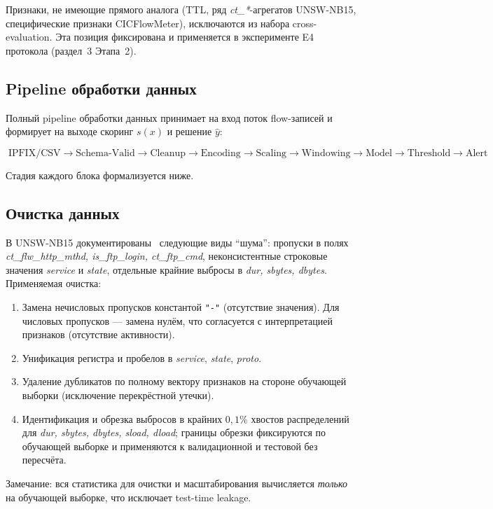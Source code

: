 Признаки, не имеющие прямого аналога (TTL, ряд \emph{ct\_*}-агрегатов
UNSW-NB15, специфические признаки CICFlowMeter), исключаются из набора
cross-evaluation. Эта позиция фиксирована и применяется в эксперименте E4
протокола (раздел~3 Этапа~2).

\subsection{Pipeline обработки данных}

Полный pipeline обработки данных принимает на вход поток flow-записей и
формирует на выходе скоринг \(s(x)\) и решение \(\hat{y}\):

\[
\boxed{\;
\text{IPFIX/CSV} \to
\text{Schema-Valid} \to
\text{Cleanup} \to
\text{Encoding} \to
\text{Scaling} \to
\text{Windowing} \to
\text{Model} \to
\text{Threshold} \to
\text{Alert}
\;}
\]

Стадия каждого блока формализуется ниже.

\subsection{Очистка данных}

В UNSW-NB15 документированы~\cite{moustafa2015unsw} следующие виды
``шума'': пропуски в полях \emph{ct\_flw\_http\_mthd, is\_ftp\_login,
ct\_ftp\_cmd}, неконсистентные строковые значения \emph{service} и
\emph{state}, отдельные крайние выбросы в \emph{dur, sbytes, dbytes}.
Применяемая очистка:

\begin{enumerate}
    \item Замена нечисловых пропусков константой \texttt{"-"} (отсутствие
    значения). Для числовых пропусков --- замена нулём, что согласуется с
    интерпретацией признаков (отсутствие активности).
    \item Унификация регистра и пробелов в \emph{service}, \emph{state},
    \emph{proto}.
    \item Удаление дубликатов по полному вектору признаков на стороне
    обучающей выборки (исключение перекрёстной утечки).
    \item Идентификация и обрезка выбросов в крайних \(0{,}1\%\) хвостов
    распределений для \emph{dur, sbytes, dbytes, sload, dload}; границы
    обрезки фиксируются по обучающей выборке и применяются к валидационной
    и тестовой без пересчёта.
\end{enumerate}

Замечание: вся статистика для очистки и масштабирования вычисляется
\emph{только} на обучающей выборке, что исключает test-time leakage.

